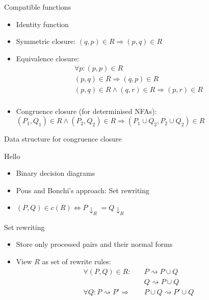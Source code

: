 \documentclass[compress]{beamer}
\begin{document}
\begin{frame}{Compatible functions}
  \begin{itemize}
    \item<1-> Identity function
    \item<2-> Symmetric closure: $(q, p) \in R \Rightarrow (p, q) \in R$
    \item<3-> Equivalence closure:
      \begin{align*}
        \forall p: (p, p) \in R\\
        (p, q) \in R \Rightarrow (q, p) \in R\\
        (p, q) \in R \land (q, r) \in R \Rightarrow (p, r) \in R\\
      \end{align*}
    \item<4-> Congruence closure (for determinised NFAs):\\
        $(P_1, Q_1) \in R \land (P_2, Q_2) \in R \Rightarrow (P_1 \cup Q_2, P_2 \cup Q_2) \in R$
  \end{itemize}
\end{frame}

\begin{frame}{Data structure for congruence closure}
  \begin{block}{Hello}
    \begin{itemize}
        \item Binary decision diagrams
        \item Pous and Bonchi's approach: Set rewriting
        \item $(P, Q) \in c(R) \Leftrightarrow P \downarrow_R = Q \downarrow_R$
    \end{itemize}
  \end{block}
  \begin{figure}
    
  \end{figure}
\end{frame}

\begin{frame}{Set rewriting}
  \begin{itemize}
    \item Store only processed pairs and their normal forms
    \item View $R$ as set of rewrite rules:
      \begin{align*}
        \forall (P, Q) \in R: \quad&P \rightsquigarrow P \cup Q\\
                              &Q \rightsquigarrow P \cup Q\\
        \forall Q: P \rightsquigarrow P' \Rightarrow & P \cup Q \rightsquigarrow P' \cup Q
      \end{align*}
  \end{itemize}
\end{frame}
\end{document}
